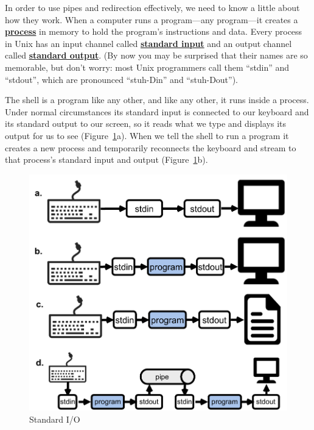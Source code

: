 \documentclass[
]{krantz}
\newcommand{\gref}[2]{\hyperlink{#2}{\textbf{#1}}}
\begin{document}
In order to use pipes and redirection effectively,
we need to know a little about how they work.
When a computer runs a program---any program---it creates a \gref{process}{process} in memory
to hold the program's instructions and data.
Every process in Unix has an input channel called \gref{standard input}{stdin}
and an output channel called \gref{standard output}{stdout}.
(By now you may be surprised that their names are so memorable,
but don't worry:
most Unix programmers call them ``stdin'' and ``stdout'',
which are pronounced ``stuh-Din'' and ``stuh-Dout'').

The shell is a program like any other,
and like any other,
it runs inside a process.
Under normal circumstances its standard input is connected to our keyboard
and its standard output to our screen,
so it reads what we type
and displays its output for us to see (Figure~\ref{fig:bash-tools-stdio}a).
When we tell the shell to run a program
it creates a new process
and temporarily reconnects the keyboard and stream
to that process's standard input and output (Figure~\ref{fig:bash-tools-stdio}b).

\begin{figure}

{\centering \includegraphics[width=1\linewidth]{figures/bash-tools/standard-io} 

}

\caption{Standard I/O}\label{fig:bash-tools-stdio}
\end{figure}
\end{document}
